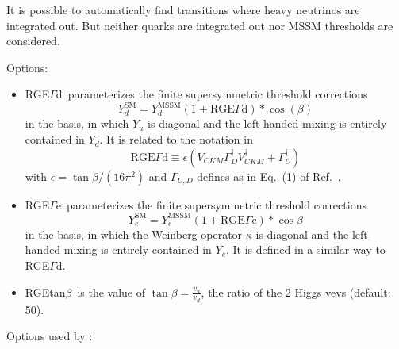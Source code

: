 \documentclass[10pt,a4paper,twoside]{scrartcl}
\begin{document}
It is possible to automatically find transitions where heavy neutrinos are
integrated out.  But neither quarks are integrated out nor MSSM thresholds are
considered. 

Options:
\begin{itemize}
\item RGE$\Gamma$d\ parameterizes the finite supersymmetric threshold corrections
\begin{equation}
Y_d^\mathrm{SM} = Y_d^\mathrm{MSSM} (1 + \mathrm{RGE}\Gamma\mathrm{d}) * \cos(\beta)
\end{equation}
in the basis, in which $Y_u$ is diagonal and the left-handed mixing is entirely contained in $Y_d$. It is related to the notation in \cite{Blazek:1995nv}
\begin{equation}
\mathrm{RGE}\Gamma\mathrm{d} \equiv \epsilon (V_{CKM} \Gamma_D^\dagger V_{CKM}^\dagger +\Gamma_U^\dagger)
\end{equation}
with $\epsilon = \tan\beta/(16 \pi^2)$ and $\Gamma_{U,D}$ defines as in Eq.~(1) of Ref.~\cite{Blazek:1995nv}. 
\item RGE$\Gamma$e\ parameterizes the finite supersymmetric threshold corrections
\begin{equation}
Y_e^\mathrm{SM} = Y_e^\mathrm{MSSM} (1 + \mathrm{RGE}\Gamma\mathrm{e}) * \cos\beta
\end{equation}
in the basis, in which the Weinberg operator $\kappa$ is diagonal and the left-handed mixing is entirely contained in $Y_e$. It is defined in a similar way to RGE$\Gamma$d.
\item RGEtan$\beta$\ is the value of $\tan\beta=\frac{v_u}{v_d}$, the ratio of the 2
  Higgs vevs (default: 50).

\end{itemize}

Options used by :
\end{document}
